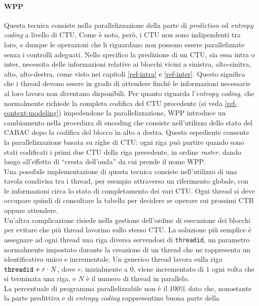 \paragraph*{WPP} Questa tecnica consiste nella parallelizzazione della parte di 
\emph{prediction} ed \emph{entropy coding} a livello di CTU. Come è noto, però, 
i CTU non sono indipendenti tra loro, e dunque le operazioni che li riguardano 
non possono 
essere parallelizzate senza i controlli adeguati. Nello specifico la predizione 
di un CTU, sia essa intra o inter, necessita delle informazioni relative ai 
blocchi vicini a sinistra, alto-sinitra, alto, alto-destra, come visto nei 
capitoli \ref{ref-intra} e \ref{ref-inter}. Questo 
significa che i thread devono essere in grado di attendere finché le 
informazioni necessarie al loro lavoro non diventano disponibili. Per quanto 
riguarda l'\emph{entropy coding}, che normalmente richiede la completa codifica 
del CTU precedente (si veda \ref{ref-context-modeling}) impedendone la 
parallelizzazione, WPP introduce 
un cambiamento nella procedura di encoding che consiste nell'utilizzo dello 
stato 
del CABAC dopo la codifica del blocco in alto a destra. Questo espediente 
consente la parallelizzazione basata su righe di CTU: ogni riga può partire 
quando sono stati codificati i primi due CTU della riga precedente, in ordine 
\emph{raster}, dando luogo all'effetto di ``cresta dell'onda'' da cui prende il 
nome WPP.\\
Una possibile implementazione di questa tecnica consiste nell'utilizzo di una 
tavola condivisa tra i thread, per esempio attraverso un riferimento globale, 
con le informazioni circa lo stato di completamento dei vari CTU. Ogni thread 
si deve occupare quindi di consultare la tabella per decidere se 
operare sui prossimi CTB oppure attendere.\\
Un'altra complicazione risiede nella gestione dell'ordine di esecuzione dei 
blocchi 
per evitare che più thread lavorino sullo stesso CTU. La soluzione più semplice 
è assegnare ad ogni thread una riga diversa servendosi di \verb|threadid|, un 
parametro normalmente impostato durante la creazione di un thread che ne 
rappresenta un identificativo unico e incrementale. Un generico thread lavora 
sulla riga $\verb|threadid| + r \cdot N$, dove $r$, inizialmente a $0$, viene 
incrementato di $1$ ogni volta che si terminata una riga, e $N$ è il numero di 
thread in parallelo.  \\
La percentuale di programma parallelizzabile non è il $100\%$ dato che, 
nonostante 
la parte predittiva e di \emph{entropy coding} rappresentino buona parte della 
